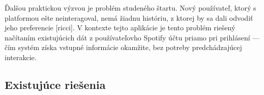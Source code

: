 Ďalšou praktickou výzvou je problém studeného štartu. Nový používateľ, ktorý s platformou ešte neinteragoval, nemá žiadnu históriu, z ktorej by sa dali odvodiť jeho preferencie [ricci]. V kontexte tejto aplikácie je tento problém riešený načítaním existujúcich dát z používateľovho Spotify účtu priamo pri prihlásení — čím systém získa vstupné informácie okamžite, bez potreby predchádzajúcej interakcie.  

\subsection{Existujúce riešenia}





